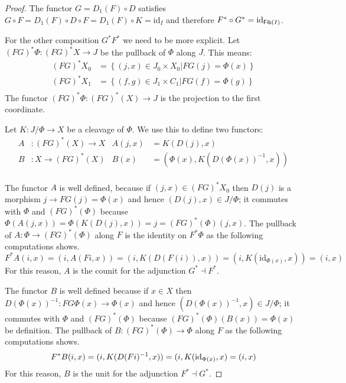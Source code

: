 \documentclass{amsart}
\theoremstyle{plain}
\theoremstyle{definition}
\newcommand\set[1]{\left\{#1\right\}}
\newcommand\id{\mathrm{id}}
\begin{document}
\begin{proof} The functor $G = D_1(F)\circ D$ satisfies $G\circ F = D_1(F)\circ D\circ F = D_1(F)\circ K = \id_I$ and therefore $F^*\circ G^* = \id_{\fib(I)}$.


For the other composition $G^* F^*$ we need to be more explicit. Let $(FG)^* \Phi: (FG)^*X\to J$ be the pullback of $\Phi$ along $J$. This means:
\begin{align*} 
(FG)^*X_0 &= \set{ (j,x)\in J_0\times X_0 | FG(j)=\Phi(x) }\\
(FG)^*X_1 &= \set{ (f,g)\in J_1\times C_1 | FG(f) = \Phi(g) }\\
\end{align*}
The functor $(FG)^*\Phi:(FG)^*(X)\to J$ is the projection to the first coordinate.

Let $K:J/\Phi \to X$ be a cleavage of $\Phi$. We use this to define two functors:
\begin{align*}
A &:(FG)^*(X)\to X & A(j,x) &= K(D(j),x)\\
B &:X\to (FG)^*(X) & B(x) &= (\Phi(x),K(D(\Phi(x))^{-1},x))\\
\end{align*}

The functor $A$ is well defined, because if $(j,x)\in (FG)^*X_0$ then $D(j)$ is a morphism $j\to FG(j) = \Phi(x)$ and hence $(D(j),x)\in J/\Phi$; it commutes with $\Phi$ and $(FG)^*(\Phi)$ because $\Phi(A(j,x)) = \Phi(K(D(j),x)) = j = (FG)^*(\Phi)(j,x)$. The pullback of $A:\Phi \to (FG)^*(\Phi)$ along $F$ is the identity on $F^*\Phi$ as the following computations shows.
\[ F^*A(i,x) = (i,A(Fi,x)) = (i,K(D(F(i)), x)) = (i,K(\id_{\Phi(x)}, x)) = (i,x) \]
For this reason, $A$ is the counit for the adjunction $G^* \dashv F^*$.

The functor $B$ is well defined because if $x\in X$ then $D(\Phi(x))^{-1}: FG\Phi(x) \to \Phi(x)$ and hence $(D(\Phi(x))^{-1},x)\in J/\Phi$; it commutes with $\Phi$ and $(FG)^*(\Phi)$ because $(FG)^*(\Phi)(B(x)) = \Phi(x)$ be definition. The pullback of $B:(FG)^*(\Phi) \to \Phi$ along $F$ as the following computations shows.
\[ F\pb B(i,x) = (i,K(D(Fi)^{-1},x)) = (i, K(\id_{\Phi(x)},x) = (i,x) \]
For this reason, $B$ is the unit for the adjunction $F^*\dashv G^*$.
\end{proof}
\end{document}

